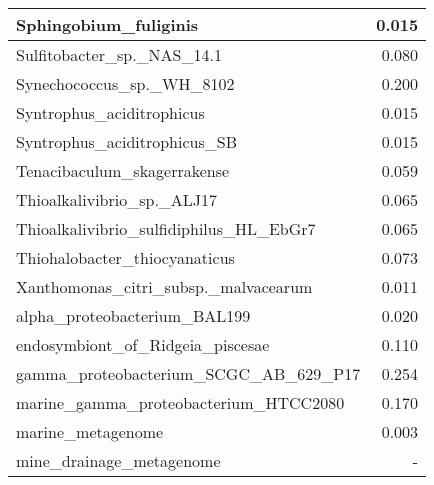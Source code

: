 \documentclass[12pt,a4paper]{article}
\begin{document}
\begin{table}[ht]
\begin{center}
\begin{tabular}{|l*{1}{|r}|}
Sphingobium\_fuliginis & 0.015 \\ \hline
Sulfitobacter\_sp.\_NAS\_14.1 & 0.080 \\ \hline
Synechococcus\_sp.\_WH\_8102 & 0.200 \\ \hline
Syntrophus\_aciditrophicus & 0.015 \\ \hline
Syntrophus\_aciditrophicus\_SB & 0.015 \\ \hline
Tenacibaculum\_skagerrakense & 0.059 \\ \hline
Thioalkalivibrio\_sp.\_ALJ17 & 0.065 \\ \hline
Thioalkalivibrio\_sulfidiphilus\_HL\_EbGr7 & 0.065 \\ \hline
Thiohalobacter\_thiocyanaticus & 0.073 \\ \hline
Xanthomonas\_citri\_subsp.\_malvacearum & 0.011 \\ \hline
alpha\_proteobacterium\_BAL199 & 0.020 \\ \hline
endosymbiont\_of\_Ridgeia\_piscesae & 0.110 \\ \hline
gamma\_proteobacterium\_SCGC\_AB\_629\_P17 & 0.254 \\ \hline
marine\_gamma\_proteobacterium\_HTCC2080 & 0.170 \\ \hline
marine\_metagenome & 0.003 \\ \hline
mine\_drainage\_metagenome & - \\ \hline
\end{tabular}
\end{center}
\end{table}
\end{document}

